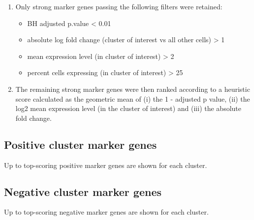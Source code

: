 \documentclass{article}
\begin{document}
\begin{enumerate}
\item Only strong marker genes passing the following filters were retained:
  \begin{itemize}
  \item BH adjusted p.value < 0.01
  \item absolute log fold change (cluster of interest vs all other cells) > 1
  \item mean expression level (in cluster of interest) > 2
  \item percent cells expressing (in cluster of interest) > 25
  \end{itemize}
\item The remaining strong marker genes were then ranked according to a heuristic score calculated as the geometric mean of (i) the 1 - adjusted p value, (ii) the log2 mean expression level (in the cluster of interest) and (iii) the absolute fold change.
  \end{enumerate}

\clearpage
\subsection{Positive cluster marker genes}

Up to \nPositiveMarkers{} top-scoring positive marker genes are shown for each cluster.



\clearpage
\subsection{Negative cluster marker genes}

Up to \nNegativeMarkers{} top-scoring negative marker genes are shown for each cluster.


\end{document}
